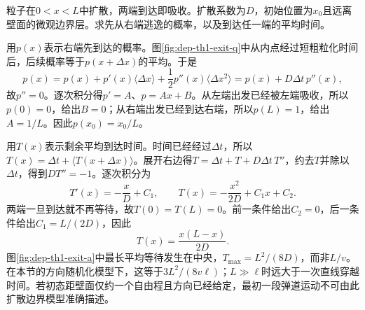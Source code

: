 \begin{example}[两吸收端之间的平均逃逸时间]
粒子在$0<x<L$中扩散，两端到达即吸收。扩散系数为$D$，初始位置为$x_0$且远离壁面的微观边界层。求先从右端逃逸的概率，以及到达任一端的平均时间。
\end{example}
\begin{solution}
用$p(x)$表示右端先到达的概率。图\ref{fig:dep-th1-exit-q}中从内点经过短粗粒化时间后，后续概率等于$p(x+\Delta x)$的平均。于是
\[
 p(x)=p(x)+p'(x)\langle\Delta x\rangle
       +\frac12p''(x)\langle\Delta x^2\rangle
     =p(x)+D\Delta t\,p''(x),
\]
故$p''=0$。逐次积分得$p'=A$、$p=Ax+B$。从左端出发已经被左端吸收，所以$p(0)=0$，给出$B=0$；从右端出发已经到达右端，所以$p(L)=1$，给出$A=1/L$。因此$p(x_0)=x_0/L$。

用$T(x)$表示剩余平均到达时间。时间已经经过$\Delta t$，所以$T(x)=\Delta t+\langle T(x+\Delta x)\rangle$。展开右边得$T=\Delta t+T+D\Delta t\,T''$，约去$T$并除以$\Delta t$，得到$DT''=-1$。逐次积分为
\[
 T'(x)=-\frac{x}{D}+C_1,\qquad
 T(x)=-\frac{x^2}{2D}+C_1x+C_2.
\]
两端一旦到达就不再等待，故$T(0)=T(L)=0$。前一条件给出$C_2=0$，后一条件给出$C_1=L/(2D)$，因此
\[
 T(x)=\frac{x(L-x)}{2D}.
\]
图\ref{fig:dep-th1-exit-a}中最长平均等待发生在中央，$T_{\max}=L^2/(8D)$，而非$L/v$。在本节的方向随机化模型下，这等于$3L^2/(8v\ell)$；$L\gg\ell$时远大于一次直线穿越时间。若初态距壁面仅约一个自由程且方向已经给定，最初一段弹道运动不可由此扩散边界模型准确描述。
\end{solution}

